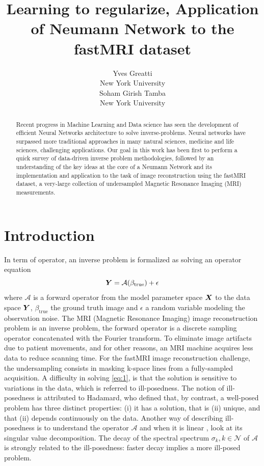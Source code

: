 \documentclass{article}
\title{Learning to regularize, Application of Neumann Network to the fastMRI dataset}
\author{%
  Yves Greatti \\
  New York University\\
   \And
    Soham Girish Tamba \\
    New York University\\
}
\begin{document}
\maketitle

\begin{abstract}
 Recent progress in Machine Learning and Data science has seen the development of efficient Neural Networks architecture to solve inverse-problems. Neural networks have surpassed more traditional approaches in 
  many natural sciences, medicine and life sciences, challenging applications.
 Our goal in this work has been first to perform a quick survey of data-driven inverse problem methodologies, followed by an understanding of the key ideas at the core of a Neumann Network and its implementation
 and application to the task of image reconstruction using the fastMRI dataset, a very-large collection of  undersampled Magnetic Resonance Imaging (MRI) measurements. 
  \end{abstract}
  
 \section{Introduction}
\label{Introduction}

In term of operator, an inverse problem is formalized as solving an operator equation
\begin{equation}
	\bm{Y} = \mathcal{A} (\beta_{\text{true}}) + \epsilon \label{eq:1}
\end{equation}
where $\mathcal{A}$ is a forward operator from the model parameter space $\bm{X}$ to the data space $\bm{Y}$,  $\beta_{\text{true}}$ the ground truth image and $\epsilon$ a random variable modeling the observation noise.
 The MRI (Magnetic Resonance Imaging) image reconstruction problem is an inverse problem, the forward operator is a discrete sampling operator concatenated with the Fourier transform.
 To eliminate image artifacts due to patient movements, and for other reasons, an MRI machine acquires less data to reduce scanning time.
For the fastMRI image reconstruction challenge, the undersampling consists  in masking k-space lines from a fully-sampled acquisition.
A difficulty in solving  \eqref{eq:1}, is that the solution is sensitive to variations in the data, which is referred to ill-posedness. The notion of  ill-posedness is attributed to Hadamard, who defined that, by contrast, a well-posed problem
has three distinct properties: (i) it has a solution, that is (ii) unique, and that (ii) depends continuously on the data. Another way of describing  ill-posedness is to understand the operator  $\mathcal{A}$ and when it is linear , look at its singular
value decomposition. The decay of the spectral spectrum $\sigma_k, k \in \mathcal{N}$ of  $\mathcal{A}$ is strongly related to the ill-posedness: faster decay implies a more ill-posed problem. 
 	
\end{document}
